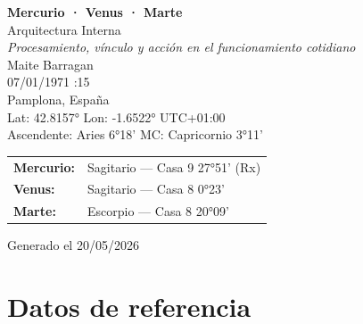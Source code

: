 \documentclass[11pt,a4paper]{article}
\begin{document}

\begin{titlepage}
  \centering

  \vspace*{2cm}

  {\Huge\bfseries\color{azulai} Mercurio · Venus · Marte}\\[0.6cm]

  {\large\color{grisai} Arquitectura Interna}\\[0.4cm]

  {\small\itshape\color{grisai}
  Procesamiento, vínculo y acción en el funcionamiento cotidiano
  }\\[2.2cm]

  {\huge\color{doradoai} Maite Barragan}\\[1.6cm]

  {\Large 07/01/1971 :15}\\[0.35cm]

  {\Large Pamplona, España}\\[0.35cm]

  {\normalsize
  Lat: 42.8157° \quad
  Lon: -1.6522° \quad
  UTC+01:00
  }\\[0.35cm]

  {\normalsize
  Ascendente: Aries 6°18'
  \quad
  MC: Capricornio 3°11'
  }\\[2.2cm]

  \renewcommand{\arraystretch}{1.35}

  \begin{tabular}{ll}
    \textbf{Mercurio:} & Sagitario — Casa 9 27°51' (Rx) \\
    \textbf{Venus:}    & Sagitario — Casa 8 0°23' \\
    \textbf{Marte:}    & Escorpio — Casa 8 20°09' \\
  \end{tabular}

  \vfill

  {\small\color{grisai}
  Generado el 20/05/2026
  }

\end{titlepage}

\justifying

\tableofcontents

\clearpage

\section{Datos de referencia}
\end{document}
